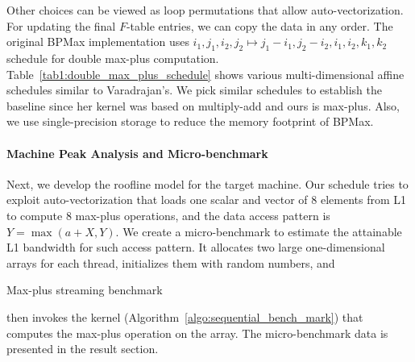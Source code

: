Other choices can be viewed as loop permutations that allow auto-vectorization. For updating the final $F$-table entries, we can copy the data in any order. The original BPMax implementation uses $ i_{1},j_{1},i_{2},j_{2} \mapsto j_{1}-i_{1},j_{2}-i_{2},i_{1}, i_{2},k_{1},k_{2} $ schedule for double max-plus computation. 
Table~\ref{tab1:double_max_plus_schedule}  
shows various multi-dimensional affine schedules similar to Varadrajan’s. We pick similar schedules to establish the baseline since her kernel was based on multiply-add and ours is max-plus. Also, we use single-precision storage to reduce the memory footprint of BPMax.

\paragraph{Machine Peak Analysis and Micro-benchmark}
Next, we develop the roofline model for the target machine. Our schedule tries to exploit auto-vectorization that loads one scalar and vector of $8$ elements from L1 to compute $8$ max-plus operations, and the data access pattern is $ Y = \max (a+X, Y)$. We create a micro-benchmark to estimate the attainable L1 bandwidth for such access pattern. It allocates two large one-dimensional arrays for each thread, initializes them with random numbers, and
\begin{algorithm}
\caption{Max-plus streaming benchmark}
\label{algo:sequential_bench_mark}
\begin{algorithmic} [1]
     \ENDFOR
  \ENDFOR 
\end{algorithmic}
\end{algorithm}
 then invokes the kernel (Algorithm~\ref{algo:sequential_bench_mark}) that computes the max-plus operation on the array.  The micro-benchmark data is presented in the result section.



